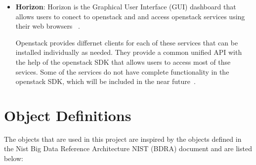 \begin{itemize}
\item \textbf{Horizon}: Horizon is the Graphical User Interface (GUI) dashboard
that allows users to conect to openstack and and access openstack
services using their web browsers~\cite{hid-sp18-503-oracle-openstack}
\cite{hid-sp18-503-horizon}.

Openstack provides differnet clients for each of these services that
can be installed individually as needed. They provide a common unified
API with the help of the openstack SDK that allows users to access
most of thse sevices. Some of the services do not have complete
functionality in the openstack SDK, which will be included in the near
future~\cite{hid-sp18-503-openstack-sdk}.
\end{itemize}



\section{Object Definitions}
The objects that are used in this project are inspired by the objects
defined in the Nist Big Data Reference Architecture NIST (BDRA)
document and are listed below:

